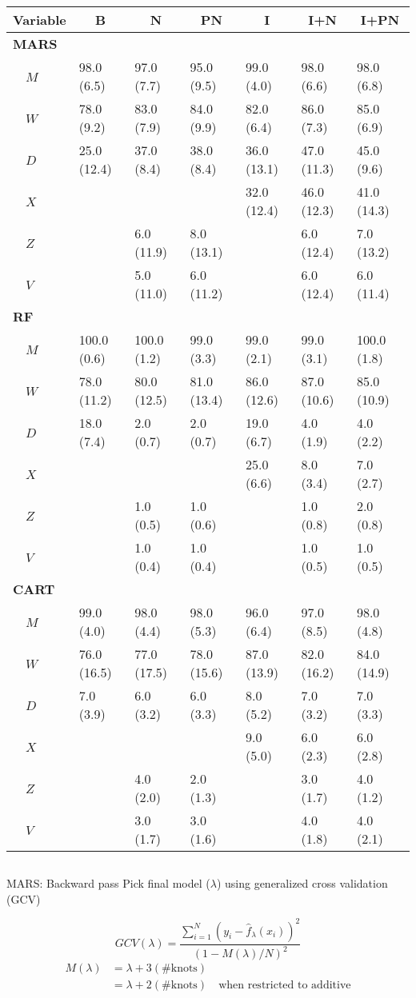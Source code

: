 \documentclass{beamer}
\begin{document}
\begin{frame}[c]{}
  \begin{columns}
    \column{\dimexpr\paperwidth}
\begin{table}
\scriptsize
\centering
\begin{tabular}{lllllll}
\toprule
\multicolumn{1}{l}{Variable}&\multicolumn{1}{c}{B}&\multicolumn{1}{c}{N}&\multicolumn{1}{c}{PN}&\multicolumn{1}{c}{I}&\multicolumn{1}{c}{I+N}&\multicolumn{1}{c}{I+PN}\tabularnewline
\midrule
{\bfseries MARS}&&&&&&\tabularnewline
~~$M$&98.0 (6.5)&97.0 (7.7)&95.0 (9.5)&99.0 (4.0)&98.0 (6.6)&98.0 (6.8)\tabularnewline
~~$W$&78.0 (9.2)&83.0 (7.9)&84.0 (9.9)&82.0 (6.4)&86.0 (7.3)&85.0 (6.9)\tabularnewline
~~$D$&25.0 (12.4)&37.0 (8.4)&38.0 (8.4)&36.0 (13.1)&47.0 (11.3)&45.0 (9.6)\tabularnewline
~~$X$&&&&32.0 (12.4)&46.0 (12.3)&41.0 (14.3)\tabularnewline
~~$Z$&&6.0 (11.9)&8.0 (13.1)&&6.0 (12.4)&7.0 (13.2)\tabularnewline
~~$V$&&5.0 (11.0)&6.0 (11.2)&&6.0 (12.4)&6.0 (11.4)\tabularnewline
\midrule
{\bfseries RF}&&&&&&\tabularnewline
~~$M$&100.0 (0.6)&100.0 (1.2)&99.0 (3.3)&99.0 (2.1)&99.0 (3.1)&100.0 (1.8)\tabularnewline
~~$W$&78.0 (11.2)&80.0 (12.5)&81.0 (13.4)&86.0 (12.6)&87.0 (10.6)&85.0 (10.9)\tabularnewline
~~$D$&18.0 (7.4)&2.0 (0.7)&2.0 (0.7)&19.0 (6.7)&4.0 (1.9)&4.0 (2.2)\tabularnewline
~~$X$&&&&25.0 (6.6)&8.0 (3.4)&7.0 (2.7)\tabularnewline
~~$Z$&&1.0 (0.5)&1.0 (0.6)&&1.0 (0.8)&2.0 (0.8)\tabularnewline
~~$V$&&1.0 (0.4)&1.0 (0.4)&&1.0 (0.5)&1.0 (0.5)\tabularnewline
\midrule
{\bfseries CART}&&&&&&\tabularnewline
~~$M$&99.0 (4.0)&98.0 (4.4)&98.0 (5.3)&96.0 (6.4)&97.0 (8.5)&98.0 (4.8)\tabularnewline
~~$W$&76.0 (16.5)&77.0 (17.5)&78.0 (15.6)&87.0 (13.9)&82.0 (16.2)&84.0 (14.9)\tabularnewline
~~$D$&7.0 (3.9)&6.0 (3.2)&6.0 (3.3)&8.0 (5.2)&7.0 (3.2)&7.0 (3.3)\tabularnewline
~~$X$&&&&9.0 (5.0)&6.0 (2.3)&6.0 (2.8)\tabularnewline
~~$Z$&&4.0 (2.0)&2.0 (1.3)&&3.0 (1.7)&4.0 (1.2)\tabularnewline
~~$V$&&3.0 (1.7)&3.0 (1.6)&&4.0 (1.8)&4.0 (2.1)\tabularnewline
\bottomrule
\end{tabular}
\end{table}
  \end{columns}
\end{frame}

\begin{frame}{MARS: Backward pass}
Pick final model ($\lambda$) using generalized cross validation (GCV) 
    
    
    \begin{equation*}
    GCV(\lambda) =
      \frac{
        \sum_{i = 1}^{N}(y_{i} - \hat{f}_{\lambda}(x_{i}))^2
      }{
        (1 - M(\lambda)/N)^2
      }
  \end{equation*}
  \begin{align*}
    M(\lambda) &= \lambda + 3(\text{\# knots}) \\
     &=\lambda + 2(\text{\# knots}) \quad \text{when restricted to additive}
  \end{align*}
\end{frame}
\end{document}
